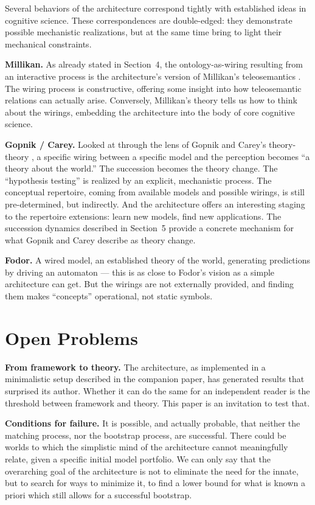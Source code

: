 \documentclass[12pt, a4paper]{article}
\begin{document}
Several behaviors of the architecture correspond tightly with established
ideas in cognitive science. These correspondences are double-edged: they
demonstrate possible mechanistic realizations, but at the same time
bring to light their mechanical constraints.

\textbf{Millikan.} As already stated in Section~4, the
ontology-as-wiring resulting from an interactive process is the
architecture's version of Millikan's teleosemantics \cite{millikan1984}.
The wiring process is constructive, offering some insight into how
teleosemantic relations can actually arise. Conversely, Millikan's
theory tells us how to think about the wirings, embedding the
architecture into the body of core cognitive science.

\textbf{Gopnik / Carey.} Looked at through the lens of Gopnik and
Carey's theory-theory \cite{gopnik1997, carey2009}, a specific wiring
between a specific model and the perception becomes ``a theory about the
world.'' The succession becomes the theory change. The ``hypothesis
testing'' is realized by an explicit, mechanistic process. The
conceptual repertoire, coming from available models and possible wirings,
is still pre-determined, but indirectly. And the architecture offers an
interesting staging to the repertoire extensions: learn new models, find
new applications. The succession dynamics described in Section~5 provide
a concrete mechanism for what Gopnik and Carey describe as theory change.

\textbf{Fodor.} A wired model, an established theory of the world,
generating predictions by driving an automaton --- this is as close to
Fodor's vision \cite{fodor2004} as a simple architecture can get. But
the wirings are not externally provided, and finding them makes
``concepts'' operational, not static symbols.

\section{Open Problems}

\textbf{From framework to theory.} The architecture, as implemented in
a minimalistic setup described in the companion paper, has generated
results that surprised its author. Whether it can do the same for an
independent reader is the threshold between framework and theory. This
paper is an invitation to test that.

\noindent\textbf{Conditions for failure.} It is possible, and actually probable,
that neither the matching process, nor the bootstrap process, are
successful. There could be worlds to which the simplistic mind of the
architecture cannot meaningfully relate, given a specific initial model
portfolio. We can only say that the overarching goal of the architecture
is not to eliminate the need for the innate, but to search for ways to
minimize it, to find a lower bound for what is known a priori which
still allows for a successful bootstrap.
\end{document}
